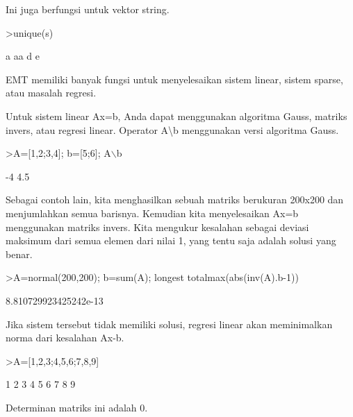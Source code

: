 \documentclass[a4paper,10pt]{article}
\begin{document}
\begin{eulernotebook}
\begin{eulercomment}
\begin{eulercomment}
\begin{eulercomment}
\begin{eulercomment}
\begin{eulercomment}
\begin{eulercomment}
\begin{eulercomment}
\begin{eulercomment}
\begin{eulercomment}
Ini juga berfungsi untuk vektor string.
\end{eulercomment}
\begin{eulerprompt}
>unique(s)
\end{eulerprompt}
\begin{euleroutput}
  a
  aa
  d
  e
\end{euleroutput}
\begin{eulercomment}
EMT memiliki banyak fungsi untuk menyelesaikan sistem linear, sistem
sparse, atau masalah regresi.

Untuk sistem linear Ax=b, Anda dapat menggunakan algoritma Gauss,
matriks invers, atau regresi linear. Operator A\textbackslash{}b menggunakan versi
algoritma Gauss.
\end{eulercomment}
\begin{eulerprompt}
>A=[1,2;3,4]; b=[5;6]; A\(\backslash\)b
\end{eulerprompt}
\begin{euleroutput}
             -4 
            4.5 
\end{euleroutput}
\begin{eulercomment}
Sebagai contoh lain, kita menghasilkan sebuah matriks berukuran
200x200 dan menjumlahkan semua barisnya. Kemudian kita menyelesaikan
Ax=b menggunakan matriks invers. Kita mengukur kesalahan sebagai
deviasi maksimum dari semua elemen dari nilai 1, yang tentu saja
adalah solusi yang benar.
\end{eulercomment}
\begin{eulerprompt}
>A=normal(200,200); b=sum(A); longest totalmax(abs(inv(A).b-1))
\end{eulerprompt}
\begin{euleroutput}
    8.810729923425242e-13 
\end{euleroutput}
\begin{eulercomment}
Jika sistem tersebut tidak memiliki solusi, regresi linear akan
meminimalkan norma dari kesalahan Ax-b.
\end{eulercomment}
\begin{eulerprompt}
>A=[1,2,3;4,5,6;7,8,9]
\end{eulerprompt}
\begin{euleroutput}
              1             2             3 
              4             5             6 
              7             8             9 
\end{euleroutput}
\begin{eulercomment}
Determinan matriks ini adalah 0.
\end{eulercomment}

\end{eulercomment}
\end{eulercomment}
\end{eulercomment}
\end{eulercomment}
\end{eulercomment}
\end{eulercomment}
\end{eulercomment}
\end{eulercomment}
\end{eulernotebook}
\end{document}

